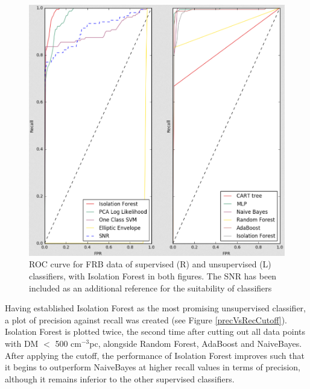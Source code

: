 \documentclass[12pt]{article}
\begin{document}
\begin{figure}[h!]
\begin{center}
\includegraphics[scale=0.5]{2roc_frb.png}
\caption{ROC curve for FRB data of supervised (R) and unsupervised (L) classifiers, with Isolation Forest in both figures. The SNR has been included as an additional reference for the suitability of classifiers}
\label{rocAll}
\end{center}
\end{figure}


Having established Isolation Forest as the most promising unsupervised classifier, a plot of precision against recall was created (see Figure \ref{precVsRecCutoff}). Isolation Forest is plotted twice, the second time after cutting out all data points with DM $<$ 500 cm$^{-3}$pc, alongside Random Forest, AdaBoost and NaiveBayes. After applying the cutoff, the performance of  Isolation Forest improves such that it begins to outperform NaiveBayes at higher recall values in terms of precision, although it remains inferior to the other supervised classifiers.
\end{document}
